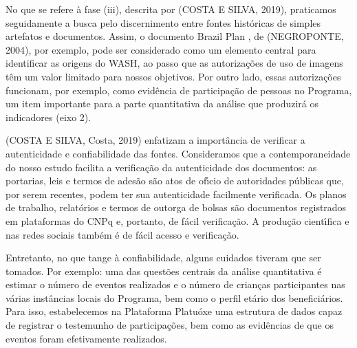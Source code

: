 \documentclass[
12pt,		%
openright,	%
twoside,  %
a4paper,			%
chapter=TITLE,		%
english,			%
french,				%
spanish,			%
brazil				%
]{USPSC-classe/USPSC}
\begin{document}
No que se refere \`a fase (iii), descrita por (COSTA E SILVA, 2019), praticamos seguidamente a busca pelo discernimento entre fontes hist\'oricas de simples artefatos e documentos. Assim, o documento \textquotedbl Brazil Plan \textquotedbl , de  (NEGROPONTE, 2004), por exemplo, pode ser considerado como um elemento central para identificar as origens do WASH, ao passo que as autoriza\c{c}\~oes de uso de imagens t\^em um valor limitado para nossos objetivos.  Por outro lado, essas autoriza\c{c}\~oes funcionam, por exemplo, como evid\^encia de participa\c{c}\~ao de pessoas no Programa, um item importante para a parte quantitativa da an\'alise que produzir\'a os indicadores (eixo 2).

















(COSTA E SILVA, Costa, 2019) enfatizam a import\^ancia de verificar a autenticidade e confiabilidade das fontes. Consideramos que a contemporaneidade do nosso estudo facilita a verifica\c{c}\~ao da autenticidade dos documentos: as portarias, leis e termos de ades\~ao s\~ao atos de of\'{\i}cio de autoridades p\'ublicas que, por serem recentes, podem ter sua autenticidade facilmente verificada. Os planos de trabalho, relat\'orios e termos de outorga de bolsas s\~ao documentos registrados em plataformas do CNPq e, portanto, de f\'acil verifica\c{c}\~ao. A produ\c{c}\~ao cient\'{\i}fica e nas redes sociais tamb\'em \'e de f\'acil acesso e verifica\c{c}\~ao.

















Entretanto, no que tange \`a confiabilidade, alguns cuidados tiveram que ser tomados. Por exemplo: uma das quest\~oes centrais da an\'alise quantitativa \'e estimar o n\'umero de eventos realizados e o n\'umero de crian\c{c}as participantes nas v\'arias inst\^ancias locais do Programa, bem como o perfil et\'ario dos benefici\'arios. Para isso, estabelecemos na Plataforma Platu\'oxe uma estrutura de dados capaz de registrar o testemunho de participa\c{c}\~oes, bem como as evid\^encias de que os eventos foram efetivamente realizados.
\end{document}
